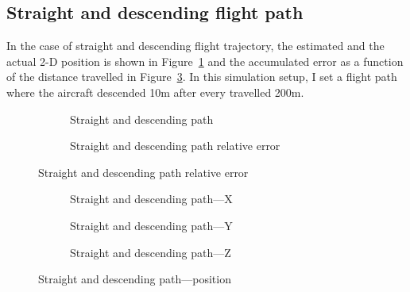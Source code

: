 \subsection{Straight and descending flight path}

In the case of straight and descending flight trajectory, the estimated and the actual 2-D position is shown in Figure~\ref{fig:straight-descending} and the accumulated error as a function of the distance travelled in Figure~\ref{fig:straight-descending-error}. In this simulation setup, I set a flight path where the aircraft descended 10\si{\meter} after every travelled 200\si{\meter}. 

\begin{figure}[H]
    \centering
    \begin{subfigure}{0.45\textwidth}
        
        \caption{Straight and descending path}\label{fig:straight-descending}
    \end{subfigure}
    \begin{subfigure}{0.45\textwidth}
        
        \caption{Straight and descending path relative error}\label{fig:straight-descending-error}
    \end{subfigure}
\end{figure}

\begin{figure}[H]
    \centering
    \begin{subfigure}{0.3\textwidth}
        
        \caption{Straight and descending path---X}
    \end{subfigure}
    \hfill
    \begin{subfigure}{0.3\textwidth}
        
        \caption{Straight and descending path---Y}
    \end{subfigure}
    \hfill
    \begin{subfigure}{0.3\textwidth}
        
        \caption{Straight and descending path---Z}
    \end{subfigure}
    \caption{Straight and descending path---position}\label{fig:straight-descending-pos}
\end{figure}


